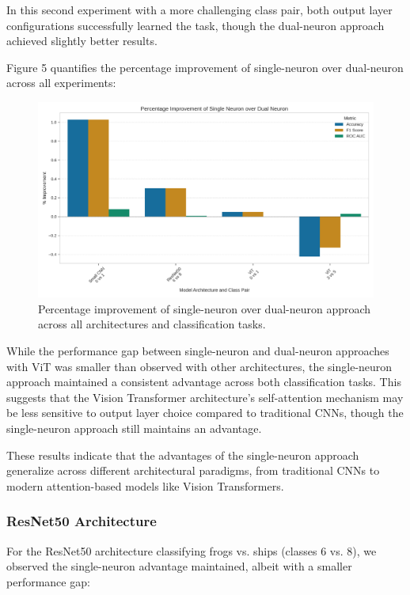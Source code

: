 \documentclass[11pt]{article}
\begin{document}
In this second experiment with a more challenging class pair, both output layer configurations successfully learned the task, though the dual-neuron approach achieved slightly better results.

Figure 5 quantifies the percentage improvement of single-neuron over dual-neuron across all experiments:

\begin{figure}[htbp]
\centering
\includegraphics[width=\textwidth]{figures/improvement_percentage.png}
\caption{Percentage improvement of single-neuron over dual-neuron approach across all architectures and classification tasks.}
\end{figure}

While the performance gap between single-neuron and dual-neuron approaches with ViT was smaller than observed with other architectures, the single-neuron approach maintained a consistent advantage across both classification tasks. This suggests that the Vision Transformer architecture's self-attention mechanism may be less sensitive to output layer choice compared to traditional CNNs, though the single-neuron approach still maintains an advantage.

These results indicate that the advantages of the single-neuron approach generalize across different architectural paradigms, from traditional CNNs to modern attention-based models like Vision Transformers.

\subsubsection{ResNet50 Architecture}
For the ResNet50 architecture classifying frogs vs. ships (classes 6 vs. 8), we observed the single-neuron advantage maintained, albeit with a smaller performance gap:
\end{document}
